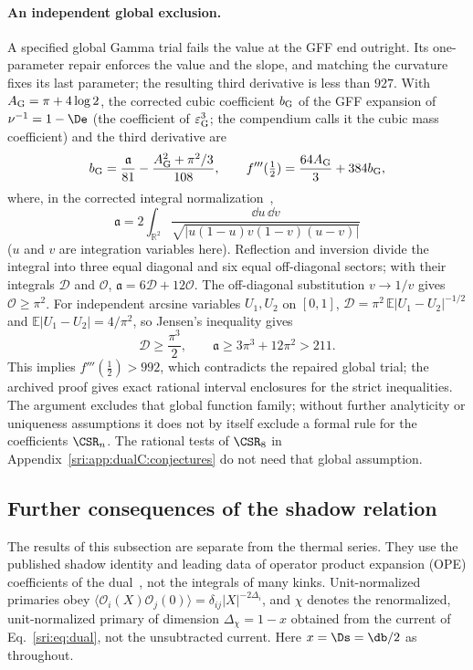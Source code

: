 \paragraph{An independent global exclusion.} A specified global Gamma trial fails the value at the GFF end outright.
Its one-parameter repair enforces the value and the slope, and matching the curvature fixes its last parameter; the
resulting third derivative is less than $927$. With $A_{\rm G}=\pi+4\log2$, the corrected cubic coefficient
$b_{\rm G}$ of the GFF expansion of $\nu^{-1}=1-\De$ (the coefficient of $\varepsilon_{\rm G}^3$; the compendium calls it
the cubic mass coefficient) and the third derivative are
\begin{equation}
 b_{\rm G}=\frac{\mathfrak a}{81}-\frac{A_{\rm G}^2+\pi^2/3}{108},\qquad f'''(\tfrac12)=\frac{64A_{\rm G}}{3}+384b_{\rm G},
\end{equation}
where, in the corrected integral normalization~\cite{sri:Benedetti:2024mqx},
\begin{equation}
 \mathfrak a=2\int_{\mathbb R^2}\frac{\dd u\,\dd v}{\sqrt{|u(1-u)v(1-v)(u-v)|}}
\end{equation}
($u$ and $v$ are integration variables here). Reflection and inversion divide the integral into three equal diagonal
and six equal off-diagonal sectors; with their integrals $\mathcal D$ and $\mathcal O$, $\mathfrak a=6\mathcal
D+12\mathcal O$. The off-diagonal substitution $v\to1/v$ gives $\mathcal O\ge\pi^2$. For independent arcsine variables
$U_1,U_2$ on $[0,1]$, $\mathcal D=\pi^2\,\mathbb E|U_1-U_2|^{-1/2}$ and $\mathbb E|U_1-U_2|=4/\pi^2$, so Jensen's
inequality gives
\begin{equation}
 \mathcal D\ge\frac{\pi^3}{2},\qquad \mathfrak a\ge3\pi^3+12\pi^2>211 .
\end{equation}
This implies $f'''(\frac12)>992$, which contradicts the repaired global trial; the archived proof gives exact rational
interval enclosures for the strict inequalities. The argument excludes that global function family; without further
analyticity or uniqueness assumptions it does not by itself exclude a formal rule for the coefficients $\CSR_n$. The
rational tests of $\CSR_8$ in Appendix~\ref{sri:app:dualC:conjectures} do not need that global assumption.

\subsection{Further consequences of the shadow relation}\label{sri:app:dualC:shadow}
The results of this subsection are separate from the thermal series. They use the published shadow identity and
leading data of operator product expansion (OPE) coefficients of the dual~\cite{sri:Benedetti:2025nzp}, not the integrals
of many kinks. Unit-normalized primaries obey $\langle\mathcal O_i(X)\mathcal O_j(0)\rangle=\delta_{ij}|X|^{-2\Delta_i}$,
and $\chi$ denotes the renormalized, unit-normalized primary of dimension $\Delta_\chi=1-x$ obtained from the current
of Eq.~\eqref{sri:eq:dual}, not the unsubtracted current. Here $x=\Ds=\db/2$ as throughout.

